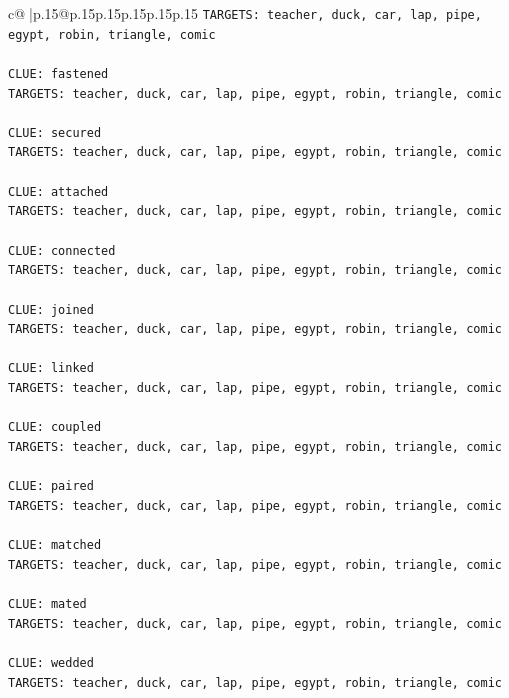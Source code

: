 \documentclass{article}
\begin{document}
{\begin{supertabular}{c@{$\;$}|p{.15\linewidth}@{}p{.15\linewidth}p{.15\linewidth}p{.15\linewidth}p{.15\linewidth}p{.15\linewidth}}
{{{\texttt{TARGETS: teacher, duck, car, lap, pipe, egypt, robin, triangle, comic} \\
\\ 
\texttt{CLUE: fastened} \\
\texttt{TARGETS: teacher, duck, car, lap, pipe, egypt, robin, triangle, comic} \\
\\ 
\texttt{CLUE: secured} \\
\texttt{TARGETS: teacher, duck, car, lap, pipe, egypt, robin, triangle, comic} \\
\\ 
\texttt{CLUE: attached} \\
\texttt{TARGETS: teacher, duck, car, lap, pipe, egypt, robin, triangle, comic} \\
\\ 
\texttt{CLUE: connected} \\
\texttt{TARGETS: teacher, duck, car, lap, pipe, egypt, robin, triangle, comic} \\
\\ 
\texttt{CLUE: joined} \\
\texttt{TARGETS: teacher, duck, car, lap, pipe, egypt, robin, triangle, comic} \\
\\ 
\texttt{CLUE: linked} \\
\texttt{TARGETS: teacher, duck, car, lap, pipe, egypt, robin, triangle, comic} \\
\\ 
\texttt{CLUE: coupled} \\
\texttt{TARGETS: teacher, duck, car, lap, pipe, egypt, robin, triangle, comic} \\
\\ 
\texttt{CLUE: paired} \\
\texttt{TARGETS: teacher, duck, car, lap, pipe, egypt, robin, triangle, comic} \\
\\ 
\texttt{CLUE: matched} \\
\texttt{TARGETS: teacher, duck, car, lap, pipe, egypt, robin, triangle, comic} \\
\\ 
\texttt{CLUE: mated} \\
\texttt{TARGETS: teacher, duck, car, lap, pipe, egypt, robin, triangle, comic} \\
\\ 
\texttt{CLUE: wedded} \\
\texttt{TARGETS: teacher, duck, car, lap, pipe, egypt, robin, triangle, comic} \\
}}}
\end{supertabular}}
\end{document}
